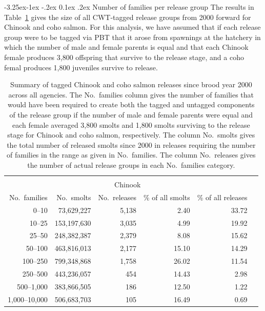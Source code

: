 \documentclass[11pt]{article}
\makeatletter
\renewcommand\subsection{\@startsection{subsection}{2}{\z@}%
                                     {-3.25ex\@plus -1ex \@minus -.2ex}%
                                     {0.1ex \@plus .2ex}%
                                     {\normalfont\normalsize\bfseries}}
\makeatother
\begin{document}
\subsection{Number of families per release group}
The results in Table~\ref{tab:relsummary} gives the size of all CWT-tagged release groups from 2000 forward for
Chinook and coho salmon.  For this analysis, we have assumed that if each release group
were to be tagged via PBT that it arose from spawnings at the hatchery in which the number of male
and female parents is equal and that each Chinook female produces 3,800 offspring that survive to the release stage, and
a coho femal produces 1,800 juveniles survive to release.


\begin{table}
\caption{Summary of tagged Chinook and coho salmon releases since brood year 2000 across all agencies.
The No.~families column gives the number of families that would have been required to
create both the tagged and untagged components of the release group if the number of male and female parents were equal and each female
averaged 3,800 smolts and 1,800 smolts surviving to the release stage for Chinook and coho salmon, respectively. The column No.~smolts gives the total number of 
released smolts since 2000
in releases requiring the number of families in the range as given in No.~families.  The column No.~releases gives the number of 
actual release groups in each No.~families category. \label{tab:relsummary}}
\begin{center}
\begin{tabular}{rrrrrr}
\hline\hline
\\
\multicolumn{5}{c}{Chinook}\\
No.~families  &  No.~smolts  &  No.~releases  &  \% of all smolts  &  \% of all releases \\ \hline
0--10  &   73,629,227  &  5,138  &  2.40  &  33.72\\
10--25  &  153,197,630  &  3,035  &  4.99  &  19.92\\
25--50  &  248,382,387  &  2,379  &  8.08  &  15.62\\
50--100  &  463,816,013  &  2,177  &  15.10  &  14.29\\
100--250  &  799,348,868  &  1,758  &  26.02  &  11.54\\
250--500  &  443,236,057  &    454  &  14.43  &  2.98\\
500--1,000  &  383,866,505  &    186  &  12.50  &  1.22\\
1,000--10,000  &  506,683,703  &    105  &  16.49  &  0.69\\\hline

\end{tabular}
\end{center}
\end{table}
\end{document}
